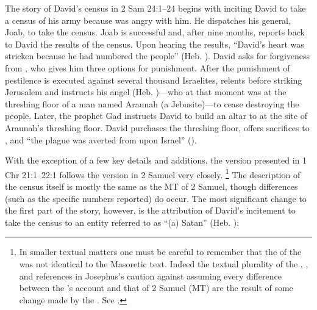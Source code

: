The story of David's census in 2 Sam 24:1--24 begins with \yahweh inciting David to take a census of his army because \yahweh was angry with him. He dispatches his general, Joab, to take the census. Joab is successful and, after nine months, reports back to David the results of the census. Upon hearing the results, ``David's heart was stricken because he had numbered the people'' (Heb. ). David asks for forgiveness from \yahweh, who gives him three options for punishment. After the punishment of pestilence is executed against several thousand Israelites, \yahweh relents before striking Jerusalem and instructs his angel (Heb. )---who at that moment was at the threshing floor of a man named Araunah (a Jebusite)---to cease destroying the people. Later, the prophet Gad instructs David to build an altar to \yahweh at the site of Araunah's threshing floor. David purchases the threshing floor, offers sacrifices to \yahweh, and ``the plague was averted from upon Israel'' ().

With the exception of a few key details and additions, the version presented in 1 Chr 21:1--22:1 follows the version in 2 Samuel very closely.%
    \footnote{In smaller textual matters one must be careful to remember that the \vorlage of the \chronicler was not identical to the Masoretic text. Indeed the textual plurality of the \lxx, , and references in Josephus's \ant caution against assuming every difference between the \chronicler's account and that of 2 Samuel (MT) are the result of some change made by the \chronicler. See \cite[761--762]{knoppers2007}.}
The description of the census itself is mostly the same as the MT of 2 Samuel, though differences (such as the specific numbers reported) do occur. The most significant change to the first part of the story, however, is the attribution of David's incitement to take the census to an entity referred to as ``(a) Satan'' (Heb. ):

